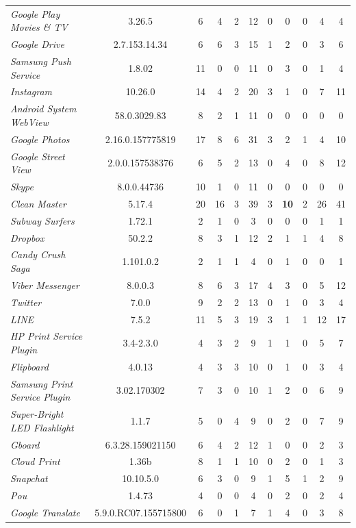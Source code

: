 \documentclass[sigconf,review, anonymous]{acmart}
\begin{document}
\begin{table}
\begin{tabular}{|l|c|cccc|ccccc|}
{\it Google Play Movies \&  TV} & 3.26.5 & 6 & 4 & 2 & 12 & 0 & 0 & 0 & 4 & 4\\
{\it Google Drive} & 2.7.153.14.34 & 6 & 6 & 3 & 15 & 1 & 2 & 0 & 3 & 6\\
{\it Samsung Push Service} & 1.8.02 & 11 & 0 & 0 & 11 & 0 & 3 & 0 & 1 & 4\\
{\it Instagram} & 10.26.0 & 14 & 4 & 2 & 20 & 3 & 1 & 0 & 7 & 11\\
{\it Android System WebView} & 58.0.3029.83 & 8 & 2 & 1 & 11 & 0 & 0 & 0 & 0 & 0\\
{\it Google Photos} & 2.16.0.157775819 & 17 & 8 & 6 & 31 & 3 & 2 & 1 & 4 & 10\\
{\it Google Street View} & 2.0.0.157538376 & 6 & 5 & 2 & 13 & 0 & 4 & 0 & 8 & 12\\
{\it Skype} & 8.0.0.44736 & 10 & 1 & 0 & 11 & 0 & 0 & 0 & 0 & 0\\
{\it Clean Master} & 5.17.4 & 20 & 16 & 3 & 39 & 3 & {\bf 10} & 2 & 26 & 41\\
{\it Subway Surfers} & 1.72.1 & 2 & 1 & 0 & 3 & 0 & 0 & 0 & 1 & 1\\
{\it Dropbox} & 50.2.2 & 8 & 3 & 1 & 12 & 2 & 1 & 1 & 4 & 8\\
{\it Candy Crush Saga} & 1.101.0.2 & 2 & 1 & 1 & 4 & 0 & 1 & 0 & 0 & 1\\
{\it Viber Messenger} & 8.0.0.3 & 8 & 6 & 3 & 17 & 4 & 3 & 0 & 5 & 12\\
{\it Twitter} & 7.0.0 & 9 & 2 & 2 & 13 & 0 & 1 & 0 & 3 & 4\\
{\it LINE} & 7.5.2 & 11 & 5 & 3 & 19 & 3 & 1 & 1 & 12 & 17\\
{\it HP Print Service Plugin} & 3.4-2.3.0 & 4 & 3 & 2 & 9 & 1 & 1 & 0 & 5 & 7\\
{\it Flipboard} & 4.0.13 & 4 & 3 & 3 & 10 & 0 & 1 & 0 & 3 & 4\\
{\it Samsung Print Service Plugin} & 3.02.170302 & 7 & 3 & 0 & 10 & 1 & 2 & 0 & 6 & 9\\
{\it Super-Bright LED Flashlight} & 1.1.7 & 5 & 0 & 4 & 9 & 0 & 2 & 0 & 7 & 9\\
{\it Gboard} & 6.3.28.159021150 & 6 & 4 & 2 & 12 & 1 & 0 & 0 & 2 & 3\\
{\it Cloud Print} & 1.36b & 8 & 1 & 1 & 10 & 0 & 2 & 0 & 1 & 3\\
{\it Snapchat} & 10.10.5.0 & 6 & 3 & 0 & 9 & 1 & 5 & 1 & 2 & 9\\
{\it Pou} & 1.4.73 & 4 & 0 & 0 & 4 & 0 & 2 & 0 & 2 & 4\\
{\it Google Translate} & 5.9.0.RC07.155715800 & 6 & 0 & 1 & 7 & 1 & 4 & 0 & 3 & 8\\

\end{tabular}
\end{table}
\end{document}
